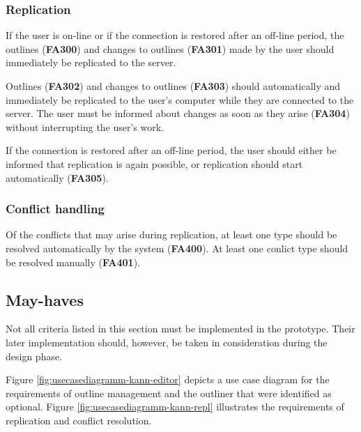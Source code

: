 \subsubsection{Replication}

If the user is on-line or if the connection is restored after an off-line period, the outlines (\textbf{FA300}) and changes to outlines (\textbf{FA301}) made by the user should immediately be replicated to the server.

Outlines (\textbf{FA302}) and changes to outlines (\textbf{FA303}) should automatically and immediately be replicated to the user's computer while they are connected to the server. The user must be informed about changes as soon as they arise (\textbf{FA304}) without interrupting the user's work.

If the connection is restored after an off-line period, the user should either be informed that replication is again possible, or replication should start automatically (\textbf{FA305}).

\subsubsection{Conflict handling}

Of the conflicts that may arise during replication, at least one type should be resolved automatically by the system (\textbf{FA400}). At least one conlict type should be resolved manually (\textbf{FA401}).

\subsection{May-haves}
\label{subsec:kann}

Not all criteria listed in this section must be implemented in the prototype. Their later implementation should, however, be taken in consideration during the design phase.

Figure \ref{fig:usecasediagramm-kann-editor} depicts a use case diagram for the requirements of outline management and the outliner that were identified as optional. Figure \ref{fig:usecasediagramm-kann-repl} illustrates the requirements of replication and conflict resolution.

